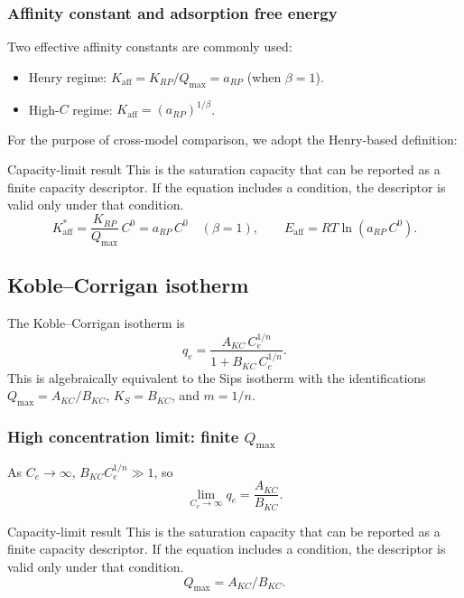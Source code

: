 \documentclass[journal=jacsat,manuscript=article]{achemso}
\begin{document}
\subsubsection{Affinity constant and adsorption free energy}

Two effective affinity constants are commonly used:
\begin{itemize}
	\item Henry regime: $K_{\mathrm{aff}} = K_{RP}/Q_{\max} = a_{RP}$ (when $\beta=1$).
	\item High-$C$ regime: $K_{\mathrm{aff}} = (a_{RP})^{1/\beta}$.
\end{itemize}
For the purpose of cross-model comparison, we adopt the Henry-based definition:
\begin{greenbox}{Capacity-limit result}
	This is the saturation capacity that can be reported as a finite capacity descriptor. If the equation includes a condition, the descriptor is valid only under that condition.
\begin{equation}
	K_{\mathrm{aff}}^{\ast} = \frac{K_{RP}}{Q_{\max}}\, C^0
		= a_{RP}\, C^0 \quad (\beta=1),
		\qquad
		E_{\mathrm{aff}} = RT\ln(a_{RP}\, C^0).
\end{equation}
\end{greenbox}

\subsection{Koble--Corrigan isotherm}
\label{sec:si_koble_corrigan}

The Koble--Corrigan isotherm is
\begin{equation}
	q_e = \frac{A_{KC}\, C_e^{1/n}}{1 + B_{KC}\, C_e^{1/n}}.
	\label{eq:si_koble_corrigan}
\end{equation}
This is algebraically equivalent to the Sips isotherm with the identifications
$Q_{\max} = A_{KC}/B_{KC}$, $K_S = B_{KC}$, and $m = 1/n$.

\subsubsection{High concentration limit: finite $Q_{\max}$}

As $C_e \to \infty$, $B_{KC}C_e^{1/n} \gg 1$, so
\begin{equation}
	\lim_{C_e \to \infty} q_e = \frac{A_{KC}}{B_{KC}}.
\end{equation}
\begin{greenbox}{Capacity-limit result}
	This is the saturation capacity that can be reported as a finite capacity descriptor. If the equation includes a condition, the descriptor is valid only under that condition.
\begin{equation}
	Q_{\max} = A_{KC}/B_{KC}.
\end{equation}
\end{greenbox}
\end{document}
